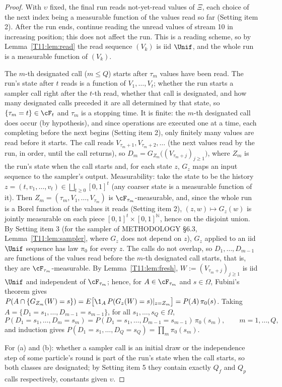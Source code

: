 \documentclass[11pt]{report}
\begin{document}
\begin{proof}
With $\upsilon$ fixed, the final run reads not-yet-read values of $\Xi$, each choice of the next index being a
measurable function of the values read so far (Setting item 2). After the run ends, continue reading the unread
values of stream 10 in increasing position; this does not affect the run. This is a reading scheme, so by
Lemma~\ref{T11:lem:read} the read sequence $(V_k)$ is iid $\Unif$, and the whole run is a measurable function of
$(V_k)$.

The $m$-th designated call ($m\le Q$) starts after $\tau_m$ values have been read. The run's state after $t$ reads is
a function of $V_1,\dots,V_t$; whether the run starts a sampler call right after the $t$-th read, whether that call is
designated, and how many designated calls preceded it are all determined by that state, so $\{\tau_m=t\}\in\cF_t$ and
$\tau_m$ is a stopping time. It is finite: the $m$-th designated call does occur (by hypothesis), and since operations
are executed one at a time, each completing before the next begins (Setting item 2), only finitely many values are read
before it starts. The call reads $V_{\tau_m+1},V_{\tau_m+2},\dots$ (the next values read by the run, in order, until the
call returns), so $D_m=G_{Z_m}\big((V_{\tau_m+j})_{j\ge1}\big)$, where $Z_m$ is the run's state when the call starts
and, for each state $z$, $G_z$ maps an input sequence to the sampler's output. Measurability: take the state to be
the history $z=(t,v_1,\dots,v_t)\in\bigsqcup_{t\ge0}[0,1]^t$ (any coarser state is a measurable function of it). Then
$Z_m=(\tau_m,V_1,\dots,V_{\tau_m})$ is $\cF_{\tau_m}$-measurable, and, since the whole run is a Borel function of the
values it reads (Setting item 2), $(z,w)\mapsto G_z(w)$ is jointly measurable on each piece $[0,1]^t\times[0,1]^{\mathbb N}$,
hence on the disjoint union.
By Setting item 3 (for the sampler of METHODOLOGY \S6.3, Lemma~\ref{T11:lem:sampler}, where $G_z$ does not depend on $z$),
$G_z$ applied to an iid $\Unif$ sequence has law $\pi_0$ for every $z$. The calls do not overlap, so
$D_1,\dots,D_{m-1}$ are functions of the values read before the $m$-th designated call starts, that is, they are
$\cF_{\tau_m}$-measurable. By Lemma~\ref{T11:lem:fresh}, $W:=(V_{\tau_m+j})_{j\ge1}$ is iid $\Unif$ and independent of
$\cF_{\tau_m}$; hence, for $A\in\cF_{\tau_m}$ and $s\in\Omega$, Fubini's theorem gives
$P(A\cap\{G_{Z_m}(W)=s\})=E\big[\1_A\,P(G_z(W)=s)|_{z=Z_m}\big]=P(A)\,\pi_0(s)$. Taking
$A=\{D_1=s_1,\dots,D_{m-1}=s_{m-1}\}$, for all $s_1,\dots,s_Q\in\Omega$,
\[
P(D_1=s_1,\dots,D_m=s_m)=P(D_1=s_1,\dots,D_{m-1}=s_{m-1})\,\pi_0(s_m),\qquad m=1,\dots,Q,
\]
and induction gives $P(D_1=s_1,\dots,D_Q=s_Q)=\prod_m\pi_0(s_m)$.

For (a) and (b): whether a sampler call is an initial draw or the independence step of some particle's round is part
of the run's state when the call starts, so both classes are designated; by Setting item 5 they contain exactly $Q_f$
and $Q_p$ calls respectively, constants given $\upsilon$.
\end{proof}
\end{document}

